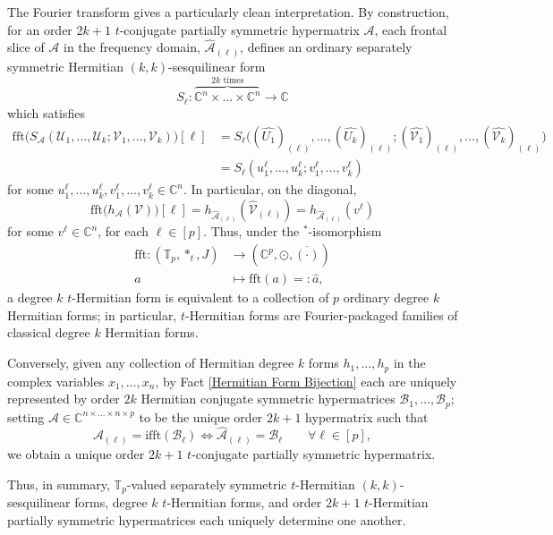 \documentclass[11pt]{article}
\begin{document}
The Fourier transform gives a particularly clean interpretation. By construction, for an order $2k+1$ $t$-conjugate partially symmetric hypermatrix $\mathcal{A}$, each frontal slice of $\mathcal{A}$ in the frequency domain, $\widehat{\mathcal{A}}_{(\ell)}$, defines an ordinary separately symmetric Hermitian $(k,k)$-sesquilinear form 
\[S_{\ell}:\overbrace{\mathbb{C}^n\times\dots\times\mathbb{C}^n}^{2k\text{ times}}\rightarrow \mathbb{C}\]
which satisfies
\begin{align*}
    \mathrm{fft}\big(S_{\mathcal{A}}(\mathcal{U}_1,\dots,\mathcal{U}_k;\mathcal{V}_1,\dots,\mathcal{V}_k)\big)[\ell] &= S_{\ell}\big((\widehat{U_1})_{(\ell)},\dots,(\widehat{U_k})_{(\ell)};(\widehat{\mathcal{V}_1})_{(\ell)},\dots,(\widehat{\mathcal{V}_k})_{(\ell)}\big) \\
    &= S_{\ell}(u_1^{\ell},\dots,u_k^{\ell};v_1^{\ell},\dots,v_k^{\ell})
\end{align*}
for some $u_1^{\ell},\dots,u_k^{\ell},v_1^{\ell},\dots,v_k^{\ell}\in \mathbb{C}^n$. In particular, on the diagonal, 
\[\mathrm{fft}\big(h_{\mathcal{A}}(\mathcal{V})\big)[\ell] = h_{\widehat{\mathcal{A}}_{(\ell)}}(\widehat{\mathcal{V}}_{(\ell)}) = h_{\widehat{\mathcal{A}}_{(\ell)}}(v^{\ell})\]
for some $v^{\ell}\in \mathbb{C}^n$, for each $\ell\in [p]$. Thus, under the $^*$-isomorphism
\begin{align*}
    \mathrm{fft}:(\mathbb{T}_p,*_t,J)&\longrightarrow (\mathbb{C}^p,\odot,\overline{(\cdot)}) \\
    a&\mapsto \mathrm{fft}(a) =: \widehat{a},
\end{align*}
a degree $k$ $t$-Hermitian form is equivalent to a collection of $p$ ordinary degree $k$ Hermitian forms; in particular, $t$-Hermitian forms are Fourier-packaged families of classical degree $k$ Hermitian forms. 

Conversely, given any collection of Hermitian degree $k$ forms $h_1,\dots,h_p$ in the complex variables $x_1,\dots,x_n$, by Fact \ref{Hermitian Form Bijection} each are uniquely represented by order $2k$ Hermitian conjugate symmetric hypermatrices $\mathcal{B}_1,\dots,\mathcal{B}_p$; setting $\mathcal{A}\in \mathbb{C}^{n\times\dots\times n\times p}$ to be the unique order $2k+1$ hypermatrix such that 
\[\mathcal{A}_{(\ell)} = \mathrm{ifft}(\mathcal{B}_{\ell}) \iff \widehat{\mathcal{A}}_{(\ell)} = \mathcal{B}_{\ell} \qquad \forall \ell\in [p],\]
we obtain a unique order $2k+1$ $t$-conjugate partially symmetric hypermatrix. 

Thus, in summary, $\mathbb{T}_p$-valued separately symmetric $t$-Hermitian $(k,k)$-sesquilinear forms, degree $k$ $t$-Hermitian forms, and order $2k+1$ $t$-Hermitian partially symmetric hypermatrices each uniquely determine one another. 
\end{document}
